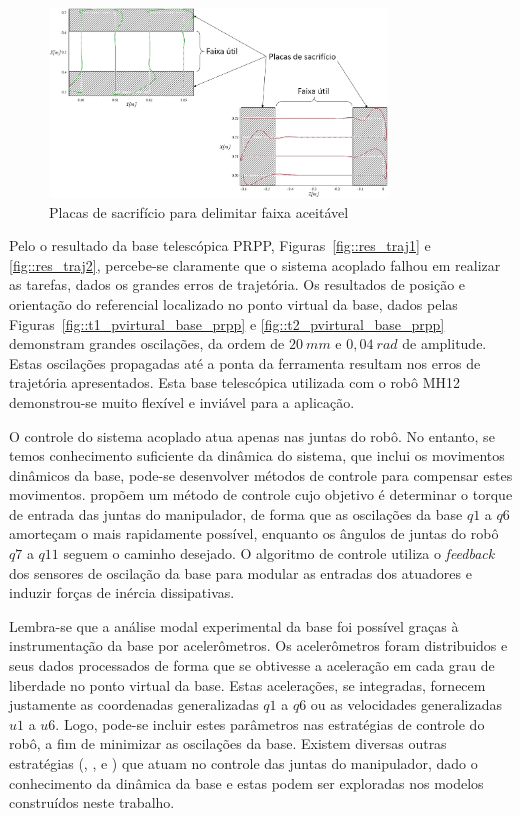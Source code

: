\begin{figure}[h!]
	\centering 
 	\includegraphics[width=0.80\textwidth]{figs/sacrificio}
 	\caption{Placas de sacrifício para delimitar faixa aceitável}
 	\label{fig::sacrificio}
\end{figure}

Pelo o resultado da base telescópica PRPP, Figuras~\ref{fig::res_traj1} e
\ref{fig::res_traj2}, percebe-se claramente que o sistema acoplado falhou em
realizar as tarefas, dados os grandes erros de trajetória. Os resultados de
posição e orientação do referencial localizado no ponto virtual da base, dados
pelas Figuras~\ref{fig::t1_pvirtural_base_prpp} e
\ref{fig::t2_pvirtural_base_prpp} demonstram grandes oscilações, da ordem de
$20~mm$ e $0,04~rad$ de amplitude. Estas oscilações propagadas até a ponta da
ferramenta resultam nos erros de trajetória apresentados. Esta base telescópica
utilizada com o robô MH12 demonstrou-se muito flexível e inviável para a
aplicação.

O controle do sistema acoplado atua apenas nas juntas do robô. No entanto, se
temos conhecimento suficiente da dinâmica do sistema, que inclui os movimentos
dinâmicos da base, pode-se desenvolver métodos de controle para compensar estes
movimentos. \citet{lew2001simple} propõem um método de controle cujo objetivo é
determinar o torque de entrada das juntas do manipulador, de forma que as
oscilações da base $q1$ a $q6$ amorteçam o mais rapidamente possível, enquanto
os ângulos de juntas do robô $q7$ a $q11$ seguem o caminho desejado. O algoritmo
de controle utiliza o \textit{feedback} dos sensores de oscilação da base para
modular as entradas dos atuadores e induzir forças de inércia dissipativas.

Lembra-se que a análise modal experimental da base foi possível graças à
instrumentação da base por acelerômetros. Os acelerômetros foram distribuidos e
seus dados processados de forma que se obtivesse a aceleração em cada grau de
liberdade no ponto virtual da base. Estas acelerações, se integradas, fornecem
justamente as coordenadas generalizadas $q1$ a $q6$ ou as velocidades
generalizadas $u1$ a $u6$. Logo, pode-se incluir estes parâmetros nas
estratégias de controle do robô, a fim de minimizar as oscilações da base.
Existem diversas outras estratégias (\cite{george2002inertial},
\cite{kwon1994input}, \cite{tahboub1998intelligent} e
\cite{nenchev1999reaction}) que atuam no controle das juntas do manipulador,
dado o conhecimento da dinâmica da base e estas podem ser exploradas nos modelos
construídos neste trabalho.


